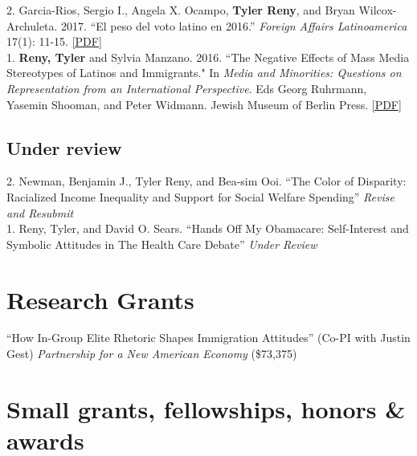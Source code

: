 \documentclass[11pt, a4paper]{article}
\newcommand{\years}[1]{\marginnote{\scriptsize #1}}
\begin{document}
\years{2017} 2. Garcia-Rios, Sergio I., Angela X. Ocampo, \textbf{Tyler Reny}, and Bryan Wilcox-Archuleta. 2017. ``El peso del voto latino en 2016.'' \textit{Foreign Affairs Latinoamerica} 17(1): 11-15. \href{http://tylerreny.github.io/pdf/pubs/reny_et_al_2017_foreign_affairs.pdf}{ [PDF]}\\

\years{2016} 1. \textbf{Reny, Tyler} and Sylvia Manzano. 2016. ``The Negative Effects of Mass Media Stereotypes of Latinos and Immigrants." In \textit{Media and Minorities: Questions on Representation from an International Perspective}. Eds Georg Ruhrmann, Yasemin Shooman, and Peter Widmann. Jewish Museum of Berlin Press. \href{http://tylerreny.github.io/pdf/pubs/reny_manzano_stereotypes_2016.pdf}{[PDF]}\\

\subsection*{Under review}

\years{} 2. Newman, Benjamin J., Tyler Reny, and Bea-sim Ooi. ``The Color of Disparity: Racialized Income Inequality and Support for Social Welfare Spending'' \textit{Revise and Resubmit}\\
\years{} 1. Reny, Tyler, and David O. Sears. ``Hands Off My Obamacare: Self-Interest and Symbolic Attitudes in The Health Care Debate'' \textit{Under Review}\\


\section*{Research Grants}

\years{2018}``How In-Group Elite Rhetoric Shapes Immigration Attitudes'' (Co-PI with Justin Gest) \textit{Partnership for a New American Economy} (\$73,375)\\

\section*{Small grants, fellowships, honors \& awards}
\end{document}
